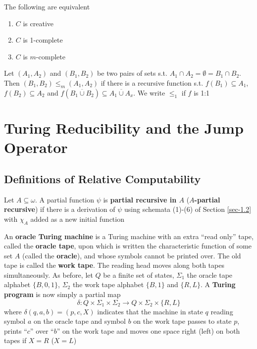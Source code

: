 \documentclass[11pt]{article}
\begin{document}
\begin{corollary}[]
The following are equivalent
\begin{enumerate}
\item \(C\) is creative
\item \(C\) is 1-complete
\item \(C\) is \(m\)-complete
\end{enumerate}
\end{corollary}

\begin{definition}[]
Let \((A_1,A_2)\) and \((B_1,B_2)\) be two pairs of sets s.t.
\(A_1\cap A_2=\emptyset=B_1\cap B_2\). Then \((B_1,B_2)\le_m(A_1,A_2)\) if
there is a recursive function s.t. \(f(B_1)\subseteq A_1\),
\(f(B_2)\subseteq A_2\) and
\(f(\overbar{B_1\cup B_2})\subseteq\overbar{A_1\cup A_x}\). We write
\(\le_1\) if \(f\) is 1:1
\end{definition}
\section{Turing Reducibility and the Jump Operator}
\label{sec:org3e6d2c8}
\subsection{Definitions of Relative Computability}
\label{sec:org26a4401}
\begin{definition}[]
Let \(A\subseteq\omega\). A partial function \(\psi\) is \textbf{partial recursive in
\(A\)} (\textbf{\(A\)-partial recursive}) if there is a derivation of \(\psi\) using
schemata (1)-(6) of Section \ref{sec-1.2} with \(\chi_A\) added as a new
initial function
\end{definition}

An \textbf{oracle Turing machine} is a Turing machine with an extra ``read only''
tape, called the \textbf{oracle tape}, upon which is written the characteristic
function of some set \(A\) (called the \textbf{oracle}), and whose symbols cannot be
printed over. The old tape is called the \textbf{work tape}. The reading head moves
along both tapes simultaneously. As before, let \(Q\) be a finite set of
states, \(\Sigma_1\) the oracle tape alphabet \(\{B,0,1\}\), \(\Sigma_2\) the
work tape alphabet \(\{B,1\}\) and \(\{R,L\}\). A \textbf{Turing program} is now
simply a partial map
\begin{equation*}
\delta:Q\times\Sigma_1\times\Sigma_2\to Q\times\Sigma_2\times\{R,L\}
\end{equation*}
where \(\delta(q,a,b)=(p,c,X)\) indicates that the machine in state \(q\)
reading symbol \(a\) on the oracle tape and symbol \(b\) on the work tape
passes to state \(p\), prints ``\(c\)'' over ``\(b\)'' on the work tape and moves
one space right (left) on both tapes if \(X=R\) (\(X=L\))
\end{document}
